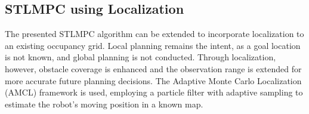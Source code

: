 \documentclass[journal]{IEEEtran}
\begin{document}
\subsection{STLMPC using Localization}

The presented STLMPC algorithm can be extended to incorporate localization to an existing occupancy grid. Local planning remains the intent, as a goal location is not known, and global planning is not conducted. Through localization, however, obstacle coverage is enhanced and the observation range is extended for more accurate future planning decisions. The Adaptive Monte Carlo Localization (AMCL) framework is used, employing a particle filter with adaptive sampling to estimate the robot's moving position in a known map. 

\begin{algorithm}[t]
\caption{STLMPC Algorithm Framework}
\label{algo3}
\DontPrintSemicolon


\end{algorithm}
\end{document}
